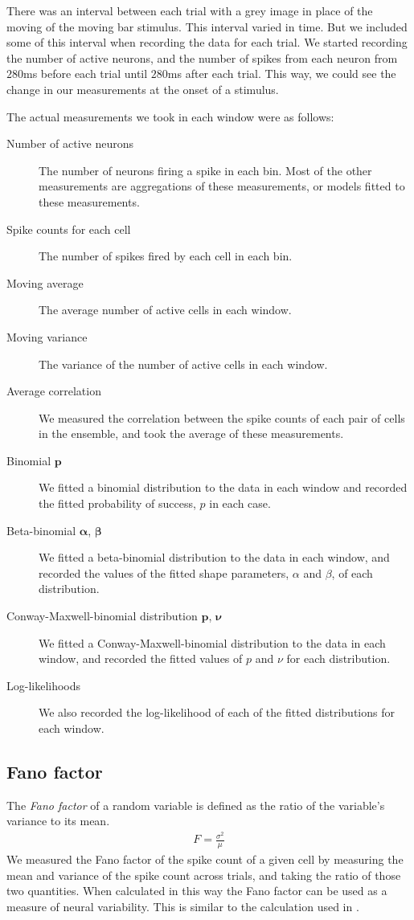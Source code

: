 \documentclass[a4paper,12pt]{article}
\theoremstyle{definition}
\begin{document}
    There was an interval between each trial with a grey image in place of the moving of the moving bar stimulus. This interval varied in time. But we included some of this interval when recording the data for each trial. We started recording the number of active neurons, and the number of spikes from each neuron from $280$ms before each trial until $280$ms after each trial. This way, we could see the change in our measurements at the onset of a stimulus.

    The actual measurements we took in each window were as follows:
    \begin{description}
      \item[Number of active neurons] The number of neurons firing a spike in each bin. Most of the other measurements are aggregations of these measurements, or models fitted to these measurements.
      \item[Spike counts for each cell] The number of spikes fired by each cell in each bin.
      \item[Moving average] The average number of active cells in each window.
      \item[Moving variance] The variance of the number of active cells in each window.
      \item[Average correlation] We measured the correlation between the spike counts of each pair of cells in the ensemble, and took the average of these measurements.
      \item[Binomial $\mathbf{p}$] We fitted a binomial distribution to the data in each window and recorded the fitted probability of success, $p$ in each case.
      \item[Beta-binomial $\boldsymbol{\alpha}$, $\boldsymbol{\beta}$] We fitted a beta-binomial distribution to the data in each window, and recorded the values of the fitted shape parameters, $\alpha$ and $\beta$, of each distribution.
      \item[Conway-Maxwell-binomial distribution $\mathbf{p}$, $\boldsymbol{\nu}$] We fitted a Conway-Maxwell-binomial distribution to the data in each window, and recorded the fitted values of $p$ and $\nu$ for each distribution.
      \item[Log-likelihoods] We also recorded the log-likelihood of each of the fitted distributions for each window.
    \end{description}

    \subsection{Fano factor}\label{sec:fano_factor}
    The \textit{Fano factor} of a random variable is defined as the ratio of the variable's variance to its mean.
    \begin{align}\label{eq:fano_factor}
      F = \frac{\sigma^2}{\mu}
    \end{align}
    We measured the Fano factor of the spike count of a given cell by measuring the mean and variance of the spike count across trials, and taking the ratio of those two quantities. When calculated in this way the Fano factor can be used as a measure of neural variability.  This is similar to the calculation used in \cite{churchland}.
\end{document}
